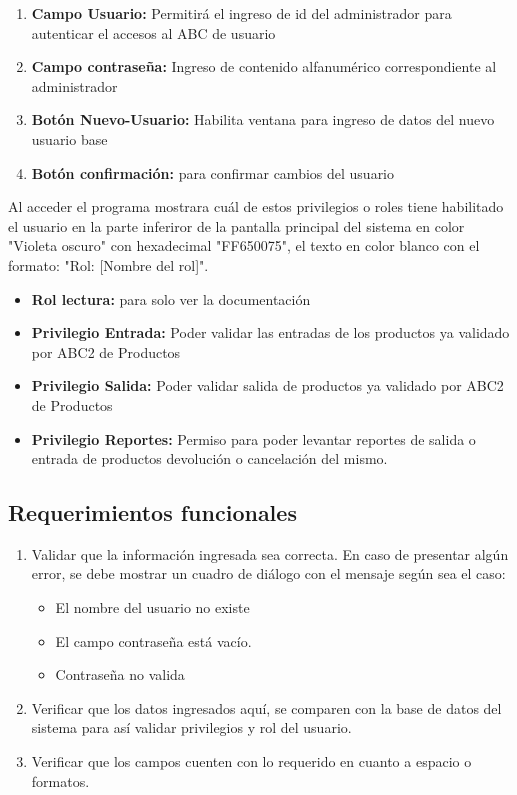 \documentclass[a4paper,DIV=12]{scrreprt}
\begin{document}
\begin{enumerate}
	\item{\textbf{Campo Usuario: }Permitirá el ingreso de id del administrador para autenticar el accesos al 
ABC de usuario
}
	\item{\textbf{Campo contraseña: }Ingreso de contenido alfanumérico correspondiente al administrador}
	\item{\textbf{Botón Nuevo-Usuario: }Habilita ventana para ingreso de datos del nuevo usuario base}
		\item{\textbf{Botón confirmación: }para confirmar cambios del usuario}		
\end{enumerate}
Al acceder el programa mostrara cuál de estos privilegios o roles tiene habilitado el usuario en la parte inferiror de la pantalla principal del sistema en color "Violeta oscuro" con hexadecimal "FF650075", el texto en color blanco con el formato: 
"Rol: [Nombre del rol]".
\begin{itemize}
	\item{\textbf{Rol lectura:} para solo ver la documentación }	
	\item{\textbf{Privilegio Entrada:} Poder validar las entradas de los productos ya validado por ABC2 de Productos}	
	\item{\textbf{Privilegio Salida:} Poder validar salida de productos ya validado por ABC2 de Productos}	
	\item{\textbf{Privilegio Reportes:} Permiso para poder levantar reportes de salida o entrada de productos devolución o cancelación del mismo.}		
\end{itemize}

\subsection*{Requerimientos funcionales}
\begin{enumerate}
	\item{Validar que la información ingresada sea correcta.
 En caso de presentar algún error, se debe mostrar un cuadro de diálogo con el mensaje según sea el caso: 
 }
	\begin{itemize}
		\item{El nombre del usuario no existe }
		\item{El campo contraseña está vacío. }
		\item{Contraseña no valida }
	\end{itemize}
	\item{Verificar que los datos ingresados aquí, se comparen con la base de datos del sistema para así validar privilegios y rol del usuario.  }
	\item{Verificar que los campos cuenten con lo requerido en cuanto a espacio o formatos. }	
\end{enumerate}
\newpage
\end{document}
